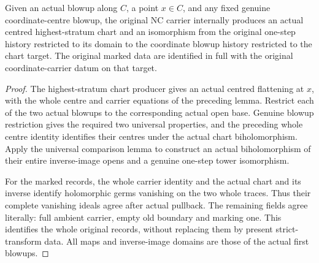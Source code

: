 \begin{theorem}
\label{hir:general-nc-actual-first-step-coordinate-history}
\leanok
{}
Given an actual blowup along $C$, a point $x\in C$, and any fixed genuine
coordinate-centre blowup, the original NC carrier internally produces an
actual centred highest-stratum chart and an isomorphism from the original
one-step history restricted to its domain to the coordinate blowup history
restricted to the chart target. The original marked data are identified
in full with the original coordinate-carrier datum on that target.
\end{theorem}
\begin{proof}
The highest-stratum chart producer gives an actual centred flattening
at $x$, with the whole centre and carrier equations of the preceding
lemma. Restrict each of the two actual blowups to the corresponding
actual open base. Genuine blowup restriction gives the required two
universal properties, and the preceding whole centre identity identifies
their centres under the actual chart biholomorphism. Apply the universal
comparison lemma to construct an actual biholomorphism of their entire
inverse-image opens and a genuine one-step tower isomorphism.

For the marked records, the whole carrier identity and the actual chart
and its inverse identify holomorphic germs vanishing on the two whole
traces. Thus their complete vanishing ideals agree after actual pullback.
The remaining fields agree literally: full ambient carrier, empty old
boundary and marking one. This identifies the whole original records,
without replacing them by present strict-transform data. All maps and
inverse-image domains are those of the actual first blowups.
\end{proof}

